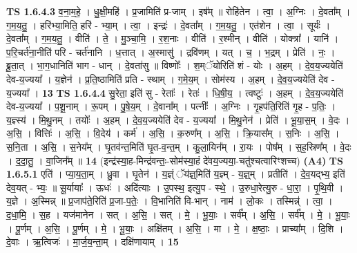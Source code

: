 \documentclass[17pt]{extarticle}
\begin{document}
                  \newline
                                \textbf{ TS 1.6.4.3} \newline
                  व॒ना॒म॒हे॒ । धु॒क्षी॒महि॑ । प्र॒जामिति॑ प्र-जाम् । इष᳚म् ॥ रोहि॑तेन । त्वा॒ । अ॒ग्निः । दे॒वता᳚म् । ग॒म॒य॒तु॒ । हरि॑भ्या॒मिति॒ हरि॑ - भ्या॒म् । त्वा॒ । इन्द्रः॑ । दे॒वता᳚म् । ग॒म॒य॒तु॒ । एत॑शेन । त्वा॒ । सूर्यः॑ । दे॒वता᳚म् । ग॒म॒य॒तु॒ । वीति॑ । ते॒ । मु॒ञ्चा॒मि॒ । र॒श॒नाः । वीति॑ । र॒श्मीन् । वीति॑ । योक्त्रा᳚ । यानि॑ । प॒रि॒चर्त॑ना॒नीति॑ परि - चर्त॑नानि । ध॒त्तात् । अ॒स्मासु॑ । द्रवि॑णम् । यत् । च॒ । भ॒द्रम् । प्रेति॑ । नः॒ । ब्रू॒ता॒त् । भा॒ग॒धानिति॑ भाग - धान् । दे॒वता॑सु ॥ विष्णोः᳚ । श॒म्ॅयोरिति॑ शं - योः । अ॒हम् । दे॒व॒य॒ज्ययेति॑ देव-य॒ज्यया᳚ । य॒ज्ञेन॑ । प्र॒ति॒ष्ठामिति॑ प्रति - स्थाम् । ग॒मे॒य॒म् । सोम॑स्य । अ॒हम् । दे॒व॒य॒ज्ययेति॑ देव - य॒ज्यया᳚ । \textbf{  13} \newline
                  \newline
                                \textbf{ TS 1.6.4.4} \newline
                  सु॒रेता॒ इति॑ सु - रेताः᳚ । रेतः॑ । धि॒षी॒य॒ । त्वष्टुः॑ । अ॒हम् । दे॒व॒य॒ज्ययेति॑ देव-य॒ज्यया᳚ । प॒शू॒नाम् । रू॒पम् । पु॒षे॒य॒म् । दे॒वाना᳚म् । पत्नीः᳚ । अ॒ग्निः । गृ॒हप॑ति॒रिति॑ गृ॒ह - प॒तिः॒ । य॒ज्ञ्स्य॑ । मि॒थु॒नम् । तयोः᳚ । अ॒हम् । दे॒व॒य॒ज्ययेति॑ देव - य॒ज्यया᳚ । मि॒थु॒नेन॑ । प्रेति॑ । भू॒या॒स॒म् । वे॒दः । अ॒सि॒ । वित्तिः॑ । अ॒सि॒ । वि॒देय॑ । कर्म॑ । अ॒सि॒ । क॒रुण᳚म् । अ॒सि॒ । क्रि॒यास᳚म् । स॒निः । अ॒सि॒ । स॒नि॒ता । अ॒सि॒ । स॒नेय᳚म् । घृ॒तव॑न्त॒मिति॑ घृ॒त-व॒न्त॒म् । कु॒ला॒यिन᳚म् । रा॒यः । पोष᳚म् । स॒ह॒स्रिण᳚म् । वे॒दः । द॒दा॒तु॒ । वा॒जिन᳚म् ॥ \textbf{  14} \newline
                  \newline
                      (इन्द्र॑स्या॒ह-मिन्द्र॑वन्तः॒-सोम॑स्या॒हं दे॑वय॒ज्यया॒-चतु॑श्चत्वारिꣳशच्च)  \textbf{(A4)} \newline \newline
                                \textbf{ TS 1.6.5.1} \newline
                  एति॑ । प्या॒य॒ता॒म् । ध्रु॒वा । घृ॒तेन॑ । य॒ज्ञ्ं ॅय॑ज्ञ्॒मिति॑ य॒ज्ञ्म् - य॒ज्ञ्॒म् । प्रतीति॑ । दे॒व॒यद्भ्य॒ इति॑ देव॒यत् - भ्यः॒ ॥ सू॒र्यायाः᳚ । ऊधः॑ । अदि॑त्याः । उ॒पस्थ॒ इत्यु॒प - स्थे॒ । उ॒रुधा॒रेत्यु॒रु - धा॒रा॒ । पृ॒थि॒वी । य॒ज्ञे । अ॒स्मिन्न् ॥ प्र॒जाप॑ते॒रिति॑ प्र॒जा-प॒तेः॒ । वि॒भानिति॑ वि-भान् । नाम॑ । लो॒कः । तस्मिन्न्॑ । त्वा॒ । द॒धा॒मि॒ । स॒ह । यज॑मानेन । सत् । अ॒सि॒ । सत् । मे॒ । भू॒याः॒ । सर्व᳚म् । अ॒सि॒ । सर्व᳚म् । मे॒ । भू॒याः॒ । पू॒र्णम् । अ॒सि॒ । पू॒र्णम् । मे॒ । भू॒याः॒ । अक्षि॑तम् । अ॒सि॒ । मा । मे॒ । क्ष॒ष्ठाः॒ । प्राच्या᳚म् । दि॒शि । दे॒वाः । ऋ॒त्विजः॑ । मा॒र्ज॒य॒न्ता॒म् । दक्षि॑णायाम् । \textbf{  15} \newline
\end{document}
